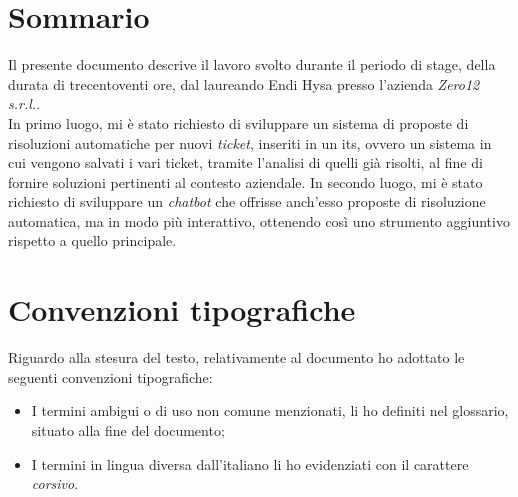 \cleardoublepage
{}
{}
\begingroup
\let\clearpage\relax
\let\cleardoublepage\relax
\let\cleardoublepage\relax

\chapter{Sommario}

Il presente documento descrive il lavoro svolto durante il periodo di stage, della durata di trecentoventi ore, dal laureando Endi Hysa presso l’azienda \textit{Zero12 s.r.l.}.\\
In primo luogo, mi è stato richiesto di sviluppare un sistema di proposte di risoluzioni automatiche per nuovi \textit{ticket}, inseriti in un \gls{its}, ovvero un sistema in cui vengono salvati i vari ticket, tramite l’analisi di quelli già risolti, al fine di fornire soluzioni pertinenti al contesto aziendale.
In secondo luogo, mi è stato richiesto di sviluppare un \textit{chatbot} che offrisse anch’esso proposte di risoluzione automatica, ma in modo più interattivo, ottenendo così uno strumento aggiuntivo rispetto a quello principale.

\chapter{Convenzioni tipografiche}
Riguardo alla stesura del testo, relativamente al documento ho adottato le seguenti convenzioni tipografiche:
\begin{itemize}
    \item I termini ambigui o di uso non comune menzionati, li ho definiti nel glossario, situato alla fine del documento;
    \item I termini in lingua diversa dall'italiano li ho evidenziati con il carattere \emph{corsivo}.
\end{itemize}



\endgroup

\vfill
